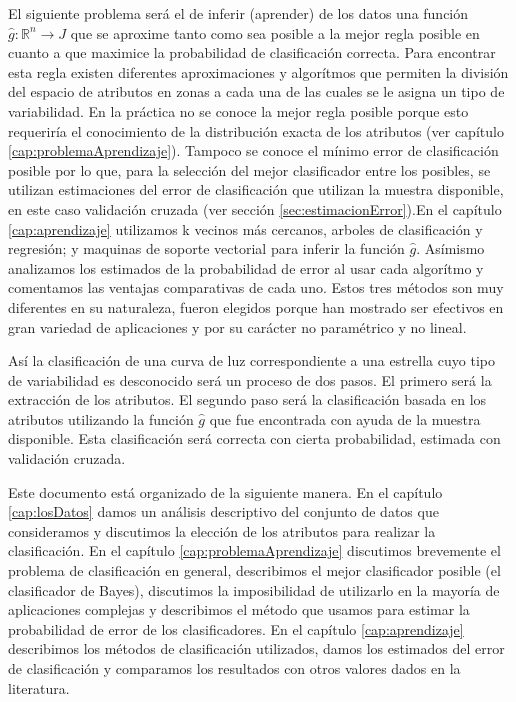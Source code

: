 \documentclass[letterpaper,12pt]{book}
\begin{document}
El siguiente problema será el de inferir (aprender) de los datos una función $\hat{g}:\mathbb{R}^n\rightarrow J$ que se aproxime tanto como sea posible a la mejor regla posible en cuanto a que maximice la probabilidad de clasificación correcta. Para encontrar esta regla existen diferentes aproximaciones y algorítmos que permiten la división del espacio de atributos en zonas a cada una de las cuales se le asigna un tipo de variabilidad. En la práctica no se conoce la mejor regla posible porque esto requeriría el conocimiento de la distribución exacta de los atributos (ver capítulo \ref{cap:problemaAprendizaje}). Tampoco se conoce el mínimo error de clasificación posible por lo que, para la selección del mejor clasificador entre los posibles, se utilizan estimaciones del error de clasificación que utilizan la muestra disponible, en este caso validación cruzada (ver sección \ref{sec:estimacionError}).En el capítulo \ref{cap:aprendizaje} utilizamos k vecinos más cercanos, arboles de clasificación y regresión; y maquinas de soporte vectorial para inferir la función $\hat{g}$. Asímismo analizamos los estimados de la probabilidad de error al usar cada algorítmo y comentamos las ventajas comparativas de cada uno. Estos tres métodos son muy diferentes en su naturaleza, fueron elegidos porque han mostrado ser efectivos en gran variedad de aplicaciones y por su carácter no paramétrico y no lineal. 

Así la clasificación de una curva de luz correspondiente a una estrella cuyo tipo de variabilidad es desconocido será un proceso de dos pasos. El primero será la extracción de los atributos. El segundo paso será la clasificación basada en los atributos utilizando la función $\hat{g}$ que fue encontrada con ayuda de la muestra disponible. Esta clasificación será correcta con cierta probabilidad, estimada con validación cruzada.

Este documento está organizado de la siguiente manera. En el capítulo \ref{cap:losDatos} damos un análisis descriptivo del conjunto de datos que consideramos y discutimos la elección de los atributos para realizar la clasificación. En el capítulo \ref{cap:problemaAprendizaje} discutimos brevemente el problema de clasificación en general, describimos el mejor clasificador posible (el clasificador de Bayes), discutimos la imposibilidad de utilizarlo en la mayoría de aplicaciones complejas y describimos el método que usamos para estimar la probabilidad de error de los clasificadores. En el capítulo \ref{cap:aprendizaje} describimos los métodos de clasificación utilizados, damos los estimados del error de clasificación y comparamos los resultados con otros valores dados en la literatura.



\end{document}
